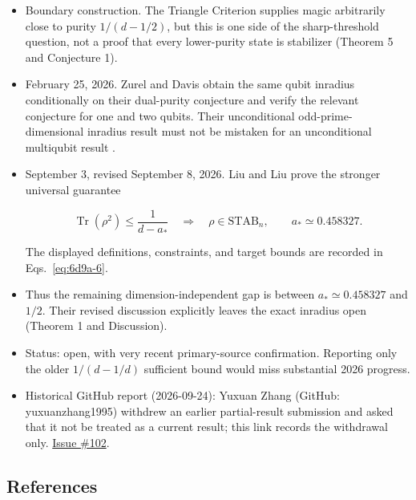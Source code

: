 \begin{itemize}
  \item Boundary construction. The Triangle Criterion supplies magic arbitrarily close to purity $1/(d-1/2)$, but this is one side of the sharp-threshold question, not a proof that every lower-purity state is stabilizer  (Theorem 5 and Conjecture 1).

  \item February 25, 2026. Zurel and Davis obtain the same qubit inradius conditionally on their dual-purity conjecture and verify the relevant conjecture for one and two qubits. Their unconditional odd-prime-dimensional inradius result must not be mistaken for an unconditional multiqubit result .

  \item September 3, revised September 8, 2026. Liu and Liu prove the stronger universal guarantee

\begin{equation}
\operatorname{Tr}(\rho^2)\leq\frac1{d-a_*}
\quad\Longrightarrow\quad\rho\in\mathrm{STAB}_n,
\qquad a_*\simeq0.458327.
\label{eq:6d9a-6}
\end{equation}

The displayed definitions, constraints, and target bounds are recorded in Eqs.~\eqref{eq:6d9a-6}.

  \item Thus the remaining dimension-independent gap is between $a_*\simeq0.458327$ and $1/2$. Their revised discussion explicitly leaves the exact inradius open  (Theorem 1 and Discussion).

  \item Status: open, with very recent primary-source confirmation. Reporting only the older $1/(d-1/d)$ sufficient bound would miss substantial 2026 progress.

  \item Historical GitHub report (2026-09-24): Yuxuan Zhang (GitHub: yuxuanzhang1995) withdrew an earlier partial-result submission and asked that it not be treated as a current result; this link records the withdrawal only. \href{https://github.com/Naixu-Guo/quantum-open-problems/issues/102}{Issue \#102}.
\end{itemize}

\subsection*{References}

